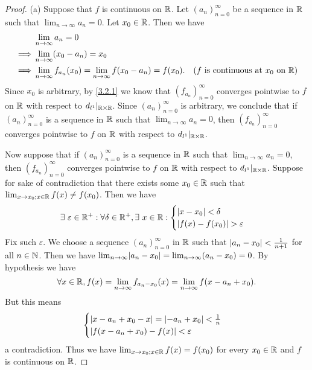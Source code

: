\begin{proof}{(a)}
  Suppose that \(f\) is continuous on \(\mathbb{R}\).
  Let \((a_n)_{n = 0}^\infty\) be a sequence in \(\mathbb{R}\) such that \(\lim_{n \to \infty} a_n = 0\).
  Let \(x_0 \in \mathbb{R}\).
  Then we have
  \begin{align*}
             & \lim_{n \to \infty} a_n = 0                                                                                                       \\
    \implies & \lim_{n \to \infty} (x_0 - a_n) = x_0                                                                                             \\
    \implies & \lim_{n \to \infty} f_{a_n}(x_0) = \lim_{n \to \infty} f(x_0 - a_n) = f(x_0). & \text{(\(f\) is continuous at \(x_0\) on \(\mathbb{R}\))}
  \end{align*}
  Since \(x_0\) is arbitrary, by \cref{3.2.1} we know that \((f_{a_n})_{n = 0}^\infty\) converges pointwise to \(f\) on \(\mathbb{R}\) with respect to \(d_{l^1}|_{\mathbb{R} \times \mathbb{R}}\).
  Since \((a_n)_{n = 0}^\infty\) is arbitrary, we conclude that if \((a_n)_{n = 0}^\infty\) is a sequence in \(\mathbb{R}\) such that \(\lim_{n \to \infty} a_n = 0\), then \((f_{a_n})_{n = 0}^\infty\) converges pointwise to \(f\) on \(\mathbb{R}\) with respect to \(d_{l^1}|_{\mathbb{R} \times \mathbb{R}}\).

  Now suppose that if \((a_n)_{n = 0}^\infty\) is a sequence in \(\mathbb{R}\) such that \(\lim_{n \to \infty} a_n = 0\), then \((f_{a_n})_{n = 0}^\infty\) converges pointwise to \(f\) on \(\mathbb{R}\) with respect to \(d_{l^1}|_{\mathbb{R} \times \mathbb{R}}\).
  Suppose for sake of contradiction that there exists some \(x_0 \in \mathbb{R}\) such that \(\lim_{x \to x_0 ; x \in \mathbb{R}} f(x) \neq f(x_0)\).
  Then we have
  \[
    \exists\ \varepsilon \in \mathbb{R}^+ : \forall \delta \in \mathbb{R}^+, \exists\ x \in \mathbb{R} : \begin{cases}
      \left\lvert x - x_0\right\rvert < \delta \\
      \left\lvert f(x) - f(x_0)\right\rvert > \varepsilon
    \end{cases}
  \]
  Fix such \(\varepsilon\).
  We choose a sequence \((a_n)_{n = 0}^\infty\) in \(\mathbb{R}\) such that \(\left\lvert a_n - x_0\right\rvert < \frac{1}{n + 1}\) for all \(n \in \mathbb{N}\).
  Then we have \(\lim_{n \to \infty} \abs{a_n - x_0} = \lim_{n \to \infty} (a_n - x_0) = 0\).
  By hypothesis we have
  \[
    \forall x \in \mathbb{R}, f(x) = \lim_{n \to \infty} f_{a_n - x_0}(x) = \lim_{n \to \infty} f(x - a_n + x_0).
  \]
  But this means
  \[
    \begin{cases}
      \left\lvert x - a_n + x_0 - x\right\rvert = \left\lvert-a_n + x_0\right\rvert < \frac{1}{n} \\
      \left\lvert f(x - a_n + x_0) - f(x)\right\rvert < \varepsilon
    \end{cases}
  \]
  a contradiction.
  Thus we have \(\lim_{x \to x_0 ; x \in \mathbb{R}} f(x) = f(x_0)\) for every \(x_0 \in \mathbb{R}\) and \(f\) is continuous on \(\mathbb{R}\).
\end{proof}

